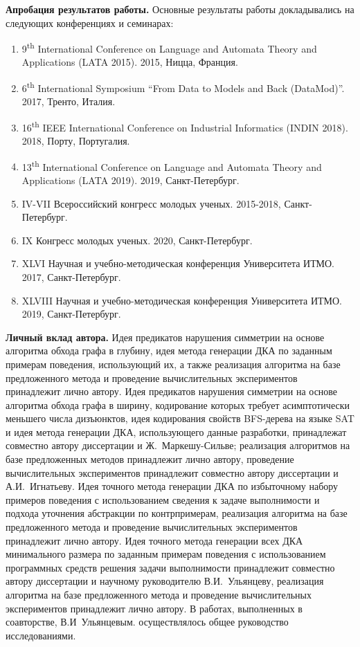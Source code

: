 \textbf{Апробация результатов работы.}
Основные результаты работы докладывались на следующих конференциях и семинарах:
\begin{enumerate}
  \item 9\textsuperscript{th} International Conference on Language and Automata Theory and Applications (LATA 2015). 2015, Ницца, Франция.
  \item 6\textsuperscript{th} International Symposium ``From Data to Models and Back (DataMod)''. 2017, Тренто, Италия.
  \item 16\textsuperscript{th} IEEE International Conference on Industrial Informatics (INDIN 2018). 2018, Порту, Португалия.
  \item 13\textsuperscript{th} International Conference on Language and Automata Theory and Applications (LATA 2019). 2019, Санкт-Петербург.
  \item IV-VII Всероссийский конгресс молодых ученых. 2015-2018, Санкт-Петербург.
  \item IX Конгресс молодых ученых. 2020, Санкт-Петербург.
  \item XLVI Научная и учебно-методическая конференция Университета \mbox{ИТМО}. 2017, Санкт-Петербург.
  \item XLVIII Научная и учебно-методическая конференция Университета ИТМО. 2019, Санкт-Петербург.
\end{enumerate}

\textbf{Личный вклад автора.}
Идея предикатов нарушения симметрии на основе алгоритма обхода графа в глубину, идея метода генерации ДКА по заданным примерам поведения, использующий их, а также реализация алгоритма на базе предложенного метода и проведение вычислительных экспериментов принадлежит лично автору.
Идея предикатов нарушения симметрии на основе алгоритма обхода графа в ширину, кодирование которых требует асимптотически меньшего числа дизъюнктов, идея кодирования свойств BFS-дерева на языке SAT и идея метода генерации ДКА, использующего данные разработки, принадлежат совместно автору диссертации и Ж.~Маркешу-Сильве; реализация алгоритмов на базе предложенных методов принадлежит лично автору, проведение вычислительных экспериментов принадлежит совместно автору диссертации и А.И.~Игнатьеву.
Идея точного метода генерации ДКА по избыточному набору примеров поведения с использованием сведения к задаче выполнимости и подхода уточнения абстракции по контрпримерам, реализация алгоритма на базе предложенного метода и проведение вычислительных экспериментов принадлежит лично автору.
Идея точного метода генерации всех ДКА минимального размера по заданным примерам поведения с использованием программных средств решения задачи выполнимости принадлежит совместно автору диссертации и научному руководителю В.И.~Ульянцеву, реализация алгоритма на базе предложенного метода и проведение вычислительных экспериментов принадлежит лично автору.
В работах, выполненных в соавторстве, В.И~Ульянцевым. осуществлялось общее руководство исследованиями.

